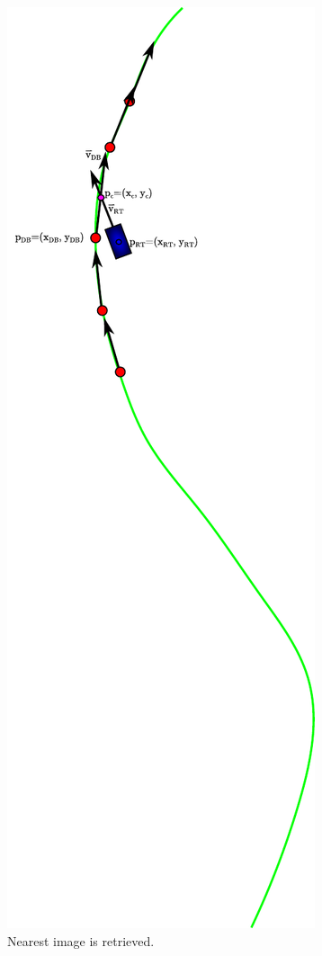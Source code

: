 \begin{figure}[thb]
  \centering
  \includegraphics[trim=0 500 90 90, clip]{nearestImage}
  \caption{Nearest image is retrieved.}
  \label{fig:cp01_nearest_image}
\end{figure}

